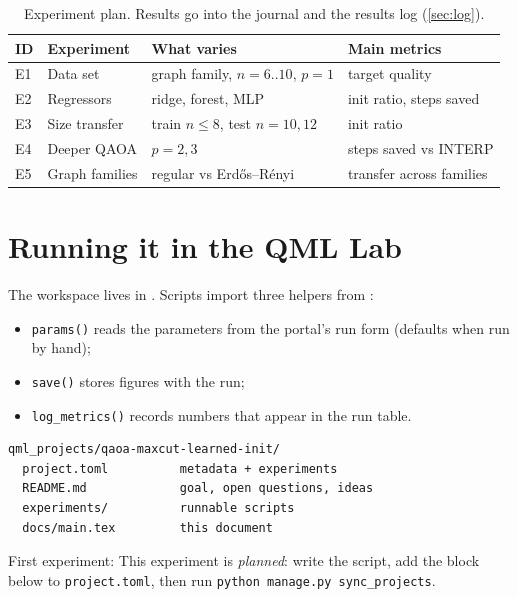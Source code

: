 \documentclass[11pt,a4paper]{article}
\begin{document}
\begin{table}[h]
\centering\small
\begin{tabularx}{\linewidth}{@{}l>{\raggedright}X>{\raggedright}X>{\raggedright\arraybackslash}X@{}}
\toprule
ID & Experiment & What varies & Main metrics \\
\midrule
  E1 & Data set & graph family, $n=6..10$, $p=1$ & target quality \\
  E2 & Regressors & ridge, forest, MLP & init ratio, steps saved \\
  E3 & Size transfer & train $n\le8$, test $n=10,12$ & init ratio \\
  E4 & Deeper QAOA & $p=2,3$ & steps saved vs INTERP \\
  E5 & Graph families & regular vs Erd\H{o}s--R\'enyi & transfer across families \\
\bottomrule
\end{tabularx}
\caption{Experiment plan. Results go into the journal and the results log (\cref{sec:log}).}
\end{table}

\section{Running it in the QML Lab}
The workspace lives in . Scripts import three helpers from
:
\begin{itemize}
  \item \texttt{params()} reads the parameters from the portal's run form (defaults when run by hand);
  \item \texttt{save()} stores figures with the run;
  \item \texttt{log\_metrics()} records numbers that appear in the run table.
\end{itemize}

\begin{lstlisting}
qml_projects/qaoa-maxcut-learned-init/
  project.toml          metadata + experiments
  README.md             goal, open questions, ideas
  experiments/          runnable scripts
  docs/main.tex         this document
\end{lstlisting}

First experiment: This experiment is \emph{planned}: write the script, add the block below to \texttt{project.toml}, then run \texttt{python manage.py sync\_projects}.
\end{document}
